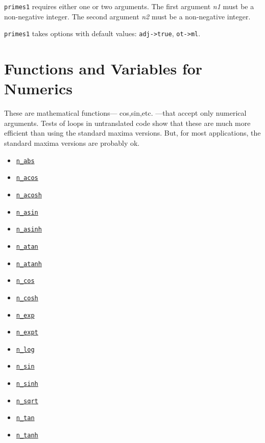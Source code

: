 \documentclass[]{article}
\begin{document}
\vspace{5 pt}

   {\tt primes1} requires either one or two arguments.
    The first argument {\it n1} must be a non-negative integer.
    The second argument {\it n2} must be a non-negative integer.


\vspace{5 pt}

{\tt primes1} takes options with default values: {\tt adj->true}, {\tt ot->ml}.
\vspace{5 pt}


\section{Functions and Variables for Numerics}

 These are mathematical functions--- cos,sin,etc. ---that accept only
 numerical arguments. Tests of loops in untranslated code show that these are much
 more efficient than using the standard maxima versions. But, for most applications, the
 standard maxima versions are probably ok.
\begin{itemize}
\item \hyperlink{n_abs}{{\tt n\_abs}}
\item \hyperlink{n_acos}{{\tt n\_acos}}
\item \hyperlink{n_acosh}{{\tt n\_acosh}}
\item \hyperlink{n_asin}{{\tt n\_asin}}
\item \hyperlink{n_asinh}{{\tt n\_asinh}}
\item \hyperlink{n_atan}{{\tt n\_atan}}
\item \hyperlink{n_atanh}{{\tt n\_atanh}}
\item \hyperlink{n_cos}{{\tt n\_cos}}
\item \hyperlink{n_cosh}{{\tt n\_cosh}}
\item \hyperlink{n_exp}{{\tt n\_exp}}
\item \hyperlink{n_expt}{{\tt n\_expt}}
\item \hyperlink{n_log}{{\tt n\_log}}
\item \hyperlink{n_sin}{{\tt n\_sin}}
\item \hyperlink{n_sinh}{{\tt n\_sinh}}
\item \hyperlink{n_sqrt}{{\tt n\_sqrt}}
\item \hyperlink{n_tan}{{\tt n\_tan}}
\item \hyperlink{n_tanh}{{\tt n\_tanh}}
\end{itemize}
\end{document}
